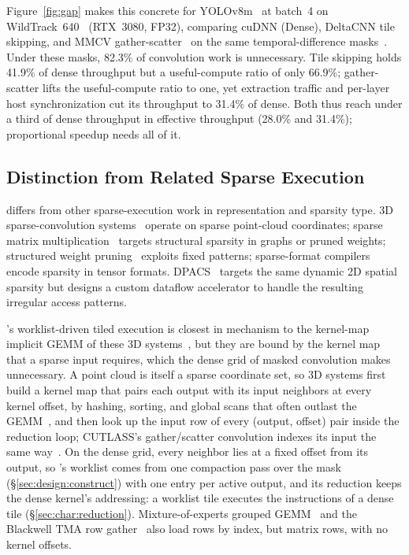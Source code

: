 Figure~\ref{fig:gap} makes this concrete for YOLOv8m~\cite{yolov8} at
batch~4 on WildTrack~640~\cite{wildtrack} (RTX~3080, FP32), comparing cuDNN
(Dense), DeltaCNN tile skipping, and MMCV gather-scatter~\cite{mmcv} on the
same temporal-difference masks~\cite{deltacnn}. Under these masks, 82.3\% of
convolution work is unnecessary. Tile skipping holds 41.9\% of dense throughput but a useful-compute ratio of only 66.9\%;
gather-scatter lifts the useful-compute ratio to one, yet extraction traffic
and per-layer host synchronization cut its throughput to 31.4\% of dense. Both thus reach under a third of
dense throughput in effective throughput (28.0\% and 31.4\%);
proportional speedup needs all of it.


\subsection{Distinction from Related Sparse Execution}
\label{sec:bg:related}

\sysname differs from other sparse-execution work in representation and
sparsity type. 3D sparse-convolution
systems~\cite{spconv2,torchsparsepp,torchsparse,minuet,minkowski,submanifold}
operate on sparse point-cloud coordinates; sparse matrix
multiplication~\cite{dtcspmm,maxkgnn,sputnik} targets structural sparsity in
graphs or pruned weights; structured weight pruning~\cite{sparse24} exploits
fixed patterns; sparse-format compilers~\cite{taco,sparsetir} encode sparsity
in tensor formats. DPACS~\cite{dpacs} targets the same dynamic 2D spatial
sparsity but designs a custom dataflow accelerator to handle the resulting
irregular access patterns.

\sysname's worklist-driven tiled execution is closest in mechanism to the
kernel-map implicit GEMM of these 3D systems~\cite{spconv2,torchsparsepp},
but they are bound by the kernel map that a sparse input requires, which the
dense grid of masked convolution makes unnecessary. A point
cloud is itself a sparse coordinate set, so 3D systems first build a kernel
map that pairs each output with its input neighbors at every kernel offset, by
hashing, sorting, and global scans that often outlast the
GEMM~\cite{torchsparsepp,minuet}, and then look up the input row of every
(output, offset) pair inside the reduction loop; CUTLASS's gather/scatter
convolution indexes its input the same way~\cite{cutlass}. On the dense grid,
every neighbor lies at a fixed offset from its output, so \sysname's worklist comes from one compaction pass over the mask
(\S\ref{sec:design:construct}) with one entry per active output, and its
reduction keeps the dense kernel's addressing: a worklist tile executes the
instructions of a dense tile (\S\ref{sec:char:reduction}). Mixture-of-experts
grouped GEMM~\cite{scattermoe,megablocks} and the Blackwell TMA row
gather~\cite{ptxisa} also load rows by index, but matrix rows, with no kernel
offsets.

